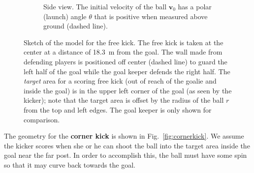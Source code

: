 \documentclass[letterpaper]{scrartcl}
\renewcommand{\vec}[1]{\ensuremath{\mathbf{#1}}}
\begin{document}
\begin{figure}
\begin{subfigure}[b]{0.4\linewidth}
    \caption{Side view. The initial velocity of the ball $\vec{v}_{0}$
      has a polar (launch) angle $\theta$ that is positive when
      measured above ground (dashed line).}
    \label{fig:freekickside}
  \end{subfigure}
  \caption{Sketch of the model for the free kick. The free kick is
    taken at the center at a distance of \SI{18.3}{m} from the
    goal. The wall made from defending players is positioned off
    center (dashed line) to guard the left half of the goal while the
    goal keeper defends the right half. The \emph{target} area for a
    scoring free kick (out of reach of the goalie and inside the goal)
    is in the upper left corner of the goal (as seen by the kicker);
    note that the target area is offset by the radius of the ball $r$
    from the top and left edges. The goal keeper is only shown for
    comparison.}
  \label{fig:freekick}
\end{figure}

The geometry for the \textbf{corner kick} is shown in
Fig.~\ref{fig:cornerkick}. We assume the kicker scores when she or he
can shoot the ball into the target area inside the goal near the far
post. In order to accomplish this, the ball must have some spin so
that it may curve back towards the goal.
\end{document}
